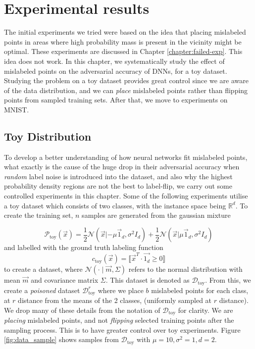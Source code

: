 \documentclass{ociamthesis}
\begin{document}
\chapter{Experimental results}
\label{chapter:experiments}

The initial experiments we tried were based on the idea that placing mislabeled
points in areas where high probability mass is present in the vicinity might be
optimal. These experiments are discussed in Chapter \ref{chapter:failed-exp}.
This idea does not work. In this chapter, we systematically study the effect of
mislabeled points on the adversarial accuracy of DNNs, for a toy dataset.
Studying the problem on a toy dataset provides great control since we are aware
of the data distribution, and we can \emph{place} mislabeled points rather than
flipping points from sampled training sets. After that, we move to experiments
on MNIST.

\section{Toy Distribution}

To develop a better understanding of how neural networks fit mislabeled points,
what exactly is the cause of the huge drop in their adversarial accuracy when
\emph{random} label noise is introduced into the dataset, and also why the
highest probability density regions are not the best to label-flip, we carry out
some controlled experiments in this chapter. Some of the following experiments
utilise a toy dataset which consists of two classes, with the instance space
being $\mathbb{R}^d$. To create the training set, $n$ samples are generated from
the gaussian mixture

\begin{equation*}
    \mathcal{P}_\text{toy}(\vec{x})=\frac{1}{2} \mathcal{N}(\vec{x}|-\mu \vec{1}_d,
    \sigma^2 I_d) + \frac{1}{2} \mathcal{N}(\vec{x}| \mu \vec{1}_d, \sigma^2 I_d)
\end{equation*}
and labelled with the ground truth labeling function 
\begin{equation*}
    c_\text{toy}(\vec{x}) = \llbracket
    \vec{x}^T \cdot\vec{1_d} \geq 0 \rrbracket 
\end{equation*}
to create a dataset, where $\mathcal{N}(\cdot \mid \vec{m}, \Sigma)$ refers to
the normal distribution with mean $\vec{m}$ and covariance matrix $\Sigma$. This
dataset is denoted as $\mathcal{D}_\text{toy}$. From this, we create a
\emph{poisoned} dataset $\mathcal{D}_\text{toy}^r$ where we place $b$ mislabeled
points for each class, at $r$ distance from the means of the 2 classes,
(uniformly sampled at $r$ distance). We drop many of these details from the
notation of $\mathcal{D}_\text{toy}$ for clarity. We are \emph{placing}
mislabeled points, and not \emph{flipping} selected training points after the
sampling process. This is to have greater control over toy experiments. Figure
\ref{fig:data_sample} shows samples from $\mathcal{D}_\text{toy}$ with $\mu=10,
\sigma^2=1, d=2$.
\end{document}
